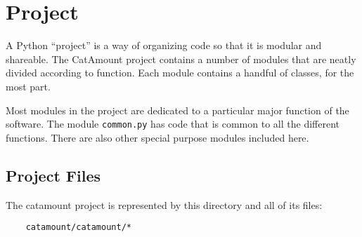 \chapter{Project}
\hypertarget{project}{}

A Python ``project'' is a way of organizing code so that it is
modular and shareable. The CatAmount project contains a number
of modules that are neatly divided according to function. Each
module contains a handful of classes, for the most part.

Most modules in the project are dedicated to a particular major
function of the software. The module \verb=common.py= has code that is
common to all the different functions. There are also other special
purpose modules included here.

\section{Project Files}

The catamount project is represented by this directory and all
of its files:

\begin{verbatim}
    catamount/catamount/*
\end{verbatim}

